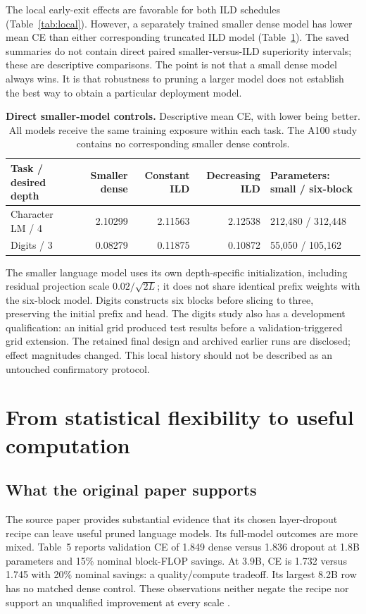 \documentclass[10pt,letterpaper]{article}
\begin{document}
The local early-exit effects are favorable for both ILD schedules (Table~\ref{tab:local}). However, a separately trained smaller dense model has lower mean CE than either corresponding truncated ILD model (Table~\ref{tab:small}). The saved summaries do not contain direct paired smaller-versus-ILD superiority intervals; these are descriptive comparisons. The point is not that a small dense model always wins. It is that robustness to pruning a larger model does not establish the best way to obtain a particular deployment model.

\begin{table}[h]
\centering\small
\caption{\textbf{Direct smaller-model controls.} Descriptive mean CE, with lower being better. All models receive the same training exposure within each task. The A100 study contains no corresponding smaller dense controls.}
\label{tab:small}
\begin{tabular}{@{}lrrrl@{}}\toprule
Task / desired depth & Smaller dense & Constant ILD & Decreasing ILD & Parameters: small / six-block\\\midrule
Character LM / 4 & 2.10299 & 2.11563 & 2.12538 & 212,480 / 312,448\\
Digits / 3 & 0.08279 & 0.11875 & 0.10872 & 55,050 / 105,162\\\bottomrule
\end{tabular}
\end{table}

The smaller language model uses its own depth-specific initialization, including residual projection scale $0.02/\sqrt{2L}$; it does not share identical prefix weights with the six-block model. Digits constructs six blocks before slicing to three, preserving the initial prefix and head. The digits study also has a development qualification: an initial grid produced test results before a validation-triggered grid extension. The retained final design and archived earlier runs are disclosed; effect magnitudes changed. This local history should not be described as an untouched confirmatory protocol.

\clearpage
\section{From statistical flexibility to useful computation}
\subsection{What the original paper supports}
The source paper provides substantial evidence that its chosen layer-dropout recipe can leave useful pruned language models. Its full-model outcomes are more mixed. Table~5 reports validation CE of 1.849 dense versus 1.836 dropout at 1.8B parameters and 15\% nominal block-FLOP savings. At 3.9B, CE is 1.732 versus 1.745 with 20\% nominal savings: a quality/compute tradeoff. Its largest 8.2B row has no matched dense control. These observations neither negate the recipe nor support an unqualified improvement at every scale \citep[Table~5]{target}.
\end{document}
